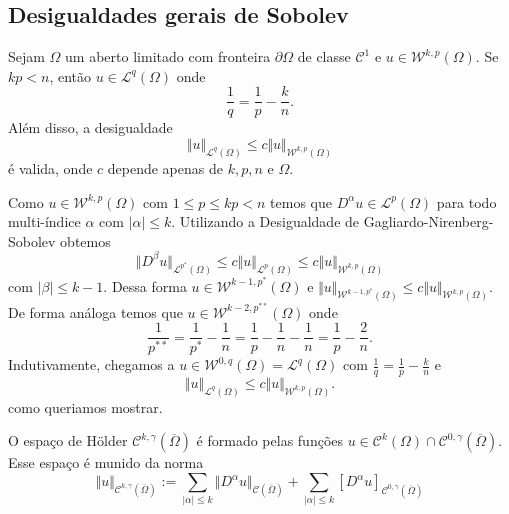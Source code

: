 \documentclass[a4paper, 11pt]{book}
\theoremstyle{definition}
\newcommand{\cC}{\mathcal{C}}
\newcommand{\cL}{\mathcal{L}}
\newcommand{\cW}{\mathcal{W}}
\begin{document}
\subsection{Desigualdades gerais de Sobolev}

\begin{tbox}
    Sejam $\Omega$ um aberto limitado com fronteira $\partial\Omega$ de classe $\cC^1$ e $u \in \cW^{k,p}(\Omega)$.
    Se $kp < n$, então $u \in \cL^q(\Omega)$ onde
    \[
        \frac{1}{q} = \frac{1}{p} - \frac{k}{n}.
    \]
    Além disso, a desigualdade
    \[
        \Vert u \Vert_{\cL^q(\Omega)} \leqslant c \Vert u \Vert_{\cW^{k,p}(\Omega)}
    \]
    é valida, onde $c$ depende apenas de $k, p, n$ e $\Omega$.
\end{tbox}
\begin{prf}
    Como $u \in \cW^{k,p}(\Omega)$ com $1 \leqslant p \leqslant kp < n$ temos que $D^\alpha u \in \cL^p(\Omega)$ para todo multi-índice $\alpha$ com $|\alpha| \leqslant k$.
    Utilizando a Desigualdade de Gagliardo-Nirenberg-Sobolev obtemos
    \[
        \Vert D^\beta u \Vert_{\cL^{p^*}(\Omega)} \leqslant c\Vert u \Vert_{\cL^p(\Omega)} \leqslant c \Vert u \Vert_{\cW^{k,p}(\Omega)}
    \]
    com $|\beta| \leqslant k-1$.
    Dessa forma $u \in \cW^{k-1,p^*}(\Omega)$ e $\Vert u \Vert_{\cW^{k-1,p^*}(\Omega)} \leqslant c \Vert u \Vert_{\cW^{k,p}(\Omega)}$.
    De forma análoga temos que $u \in \cW^{k-2,p^{**}}(\Omega)$ onde
    \[
        \frac{1}{p^{**}} = \frac{1}{p^*} - \frac{1}{n} = \frac{1}{p} - \frac{1}{n} - \frac{1}{n} = \frac{1}{p} - \frac{2}{n}.
    \]
    Indutivamente, chegamos a $u \in \cW^{0,q}(\Omega) = \cL^q(\Omega)$ com $\frac{1}{q} = \frac{1}{p} - \frac{k}{n}$ e
    \[
        \Vert u \Vert_{\cL^q(\Omega)} \leqslant c \Vert u \Vert_{\cW^{k,p}(\Omega)}.
    \]
    como queriamos mostrar.
\end{prf}

\begin{dbox}
    O espaço de Hölder $\cC^{k,\gamma}(\overline\Omega)$ é formado pelas funções $u \in \cC^k(\Omega) \cap \cC^{0,\gamma}(\overline\Omega)$. Esse espaço é munido da norma
    \[
        \Vert u \Vert_{\cC^{k,\gamma}(\overline\Omega)} := \sum_{|\alpha| \leqslant k} \Vert D^{\alpha}u \Vert_{\cC(\overline\Omega)} + \sum_{|\alpha| \leqslant k} [D^\alpha u]_{\cC^{0,\gamma}(\overline\Omega)}
    \] 
\end{dbox}
\end{document}
